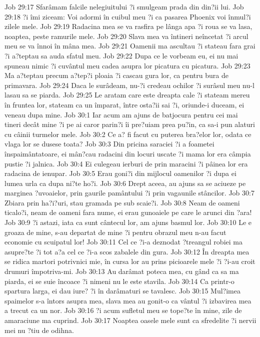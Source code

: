 Job 29:17  Sfarâmam falcile nelegiuitului ?i smulgeam prada din din?ii lui.
Job 29:18  ?i îmi ziceam: Voi adormi în cuibul meu ?i ca pasarea Phoenix voi înmul?i zilele mele.
Job 29:19  Radacina mea se va rasfira pe lânga apa ?i roua se va lasa, noaptea, peste ramurile mele.
Job 29:20  Slava mea va întineri neîncetat ?i arcul meu se va înnoi în mâna mea.
Job 29:21  Oamenii ma ascultau ?i stateau fara grai ?i a?teptau sa auda sfatul meu.
Job 29:22  Dupa ce le vorbeam eu, ei nu mai spuneau nimic ?i cuvântul meu cadea asupra lor picatura cu picatura.
Job 29:23  Ma a?teptau precum a?tep?i ploaia ?i cascau gura lor, ca pentru bura de primavara.
Job 29:24  Daca le surâdeam, nu-?i credeau ochilor ?i surâsul meu nu-l lasau sa se piarda.
Job 29:25  Le aratam care este dreapta cale ?i stateam mereu în fruntea lor, stateam ca un împarat, între osta?ii sai ?i, oriunde-i duceam, ei veneau dupa mine.
Job 30:1  Iar acum am ajuns de batjocura pentru cei mai tineri decât mine ?i pe ai caror parin?i îi pre?uiam prea pu?in, ca sa-i pun alaturi cu câinii turmelor mele.
Job 30:2  Ce a? fi facut cu puterea bra?elor lor, odata ce vlaga lor se dusese toata?
Job 30:3  Din pricina saraciei ?i a foametei înspaimântatoare, ei mân?cau radacini din locuri uscate ?i mama lor era câmpia pustie ?i jalnica.
Job 30:4  Ei culegeau ierburi de prin maracini ?i pâinea lor era radacina de ienupar.
Job 30:5  Erau goni?i din mijlocul oamenilor ?i dupa ei lumea urla ca dupa ni?te ho?i.
Job 30:6  Drept aceea, au ajuns sa se aciueze pe marginea ?uvoaielor, prin gaurile pamântului ?i prin vagaunile stâncilor.
Job 30:7  Zbiara prin ha?i?uri, stau gramada pe sub scaie?i.
Job 30:8  Neam de oameni ticalo?i, neam de oameni fara nume, ei erau gunoaiele pe care le arunci din ?ara!
Job 30:9  ?i astazi, iata ca sunt cântecul lor, am ajuns basmul lor.
Job 30:10  Le e groaza de mine, s-au departat de mine ?i pentru obrazul meu n-au facut economie cu scuipatul lor!
Job 30:11  Cel ce ?i-a deznodat ?treangul robiei ma asupre?te ?i tot a?a cel ce ?i-a scos zabalele din gura.
Job 30:12  În dreapta mea se ridica martori potrivnici mie, în cursa lor au prins picioarele mele ?i ?i-au croit drumuri împotriva-mi.
Job 30:13  Au darâmat poteca mea, cu gând ca sa ma piarda, ei se suie încoace ?i nimeni nu le este stavila.
Job 30:14  Ca printr-o spartura larga, ei dau iure? ?i în darâmaturi se tavalesc.
Job 30:15  Mul?imea spaimelor s-a întors asupra mea, slava mea au gonit-o ca vântul ?i izbavirea mea a trecut ca un nor.
Job 30:16  ?i acum sufletul meu se tope?te în mine, zile de amaraciune ma cuprind.
Job 30:17  Noaptea oasele mele sunt ca sfredelite ?i nervii mei nu ?tiu de odihna.
